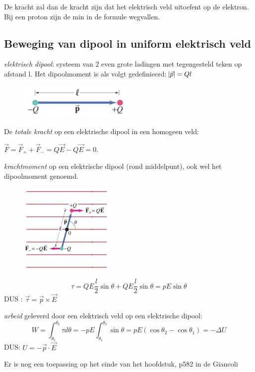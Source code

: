 \documentclass[12pt,a4paper]{article}
\begin{document}
	De kracht zal dan de kracht zijn dat het elektrisch veld uitoefent op de elektron. Bij een proton zijn de min in de formule wegvallen. 
	
	\subsection{Beweging van dipool in uniform elektrisch veld}
	\textit{elektrisch dipool}: systeem van 2 even grote ladingen met tegengesteld teken op afstand l.
	Het dipoolmoment is als volgt gedefinieerd: \(\abs{\vec{p}} = Ql\)
	\begin{figure}[h]
		\centering
		\includegraphics[width=0.3\linewidth]{dipool}
		\label{fig:dipool}
	\end{figure}

	De \textit{totale kracht} op een elektrische dipool in een homogeen veld: 

	\(\vec{F} = \vec{F}_+ + \vec{F}_- = Q\vec{E} - Q\vec{E} = 0\).
	
	\textit{krachtmoment} op een elektrische dipool (rond middelpunt), ook wel het dipoolmoment genoemd. 
	\begin{figure}[h]
		\centering
		\includegraphics[width=0.4\linewidth]{dippoolmoment}
		\label{fig:dippoolmoment}
	\end{figure}
	\newpage
	\[\tau = QE\frac{l}{2}\sin\theta + QE\frac{l}{2}\sin\theta = pE\sin\theta\]	
	DUS : \(\vec{\tau} = \vec{p} \times \vec{E}\)
	
	\textit{arbeid} geleverd door een elektrisch veld op een elektrische dipool:
	\[W = \int_{\theta_1}^{\theta_2}\tau d\theta = -pE\int_{\theta_1}^{\theta_2}\sin\theta = pE(\cos\theta_2 - \cos\theta_1) = -\Delta U\]
	DUS: \(U = -\vec{p} \cdot \vec{E}\)
	
	Er is nog een toepassing op het einde van het hoofdstuk, p582 in de Giancoli
	
\end{document}
